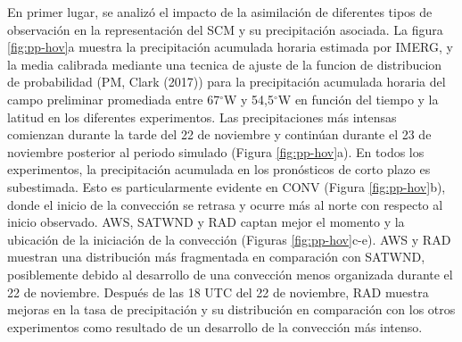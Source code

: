 \documentclass[12pt,oneside,a4paper]{reedthesis}
\begin{document}
En primer lugar, se analizó el impacto de la asimilación de diferentes tipos de observación en la representación del SCM y su precipitación asociada. La figura \ref{fig:pp-hov}a muestra la precipitación acumulada horaria estimada por IMERG, y la media calibrada mediante una tecnica de ajuste de la funcion de distribucion de probabilidad (PM, Clark (2017)) para la precipitación acumulada horaria del campo preliminar promediada entre 67\(^{\circ}\)W y 54,5\(^{\circ}\)W en función del tiempo y la latitud en los diferentes experimentos. Las precipitaciones más intensas comienzan durante la tarde del 22 de noviembre y continúan durante el 23 de noviembre posterior al periodo simulado (Figura \ref{fig:pp-hov}a). En todos los experimentos, la precipitación acumulada en los pronósticos de corto plazo es subestimada. Esto es particularmente evidente en CONV (Figura \ref{fig:pp-hov}b), donde el inicio de la convección se retrasa y ocurre más al norte con respecto al inicio observado. AWS, SATWND y RAD captan mejor el momento y la ubicación de la iniciación de la convección (Figuras \ref{fig:pp-hov}c-e). AWS y RAD muestran una distribución más fragmentada en comparación con SATWND, posiblemente debido al desarrollo de una convección menos organizada durante el 22 de noviembre. Después de las 18 UTC del 22 de noviembre, RAD muestra mejoras en la tasa de precipitación y su distribución en comparación con los otros experimentos como resultado de un desarrollo de la convección más intenso.
\end{document}

